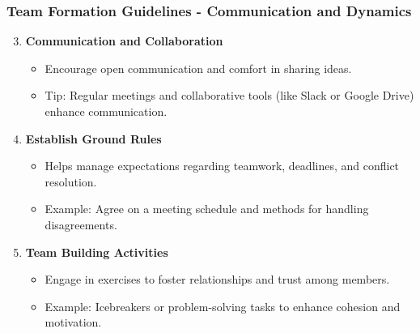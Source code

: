 \documentclass[aspectratio=169]{beamer}
\begin{document}
\begin{frame}[fragile]
    \frametitle{Team Formation Guidelines - Communication and Dynamics}
    \begin{enumerate}
        \setcounter{enumi}{2}
        \item \textbf{Communication and Collaboration}
            \begin{itemize}
                \item Encourage open communication and comfort in sharing ideas.
                \item Tip: Regular meetings and collaborative tools (like Slack or Google Drive) enhance communication.
            \end{itemize}

        \item \textbf{Establish Ground Rules}
            \begin{itemize}
                \item Helps manage expectations regarding teamwork, deadlines, and conflict resolution.
                \item Example: Agree on a meeting schedule and methods for handling disagreements.
            \end{itemize}

        \item \textbf{Team Building Activities}
            \begin{itemize}
                \item Engage in exercises to foster relationships and trust among members.
                \item Example: Icebreakers or problem-solving tasks to enhance cohesion and motivation.
            \end{itemize}
    \end{enumerate}
\end{frame}
\end{document}
